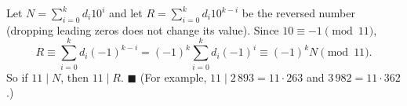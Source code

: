 Let $N=\sum_{i=0}^{k}d_i10^i$ and let $R=\sum_{i=0}^{k}d_i10^{k-i}$ be the reversed number (dropping leading zeros does not change its value). Since $10\equiv-1\pmod{11}$,
\[R\equiv\sum_{i=0}^{k}d_i(-1)^{k-i}=(-1)^k\sum_{i=0}^{k}d_i(-1)^{i}\equiv(-1)^kN\pmod{11}.\]
So if $11\mid N$, then $11\mid R$. $\blacksquare$ (For example, $11\mid 2\,893=11\cdot263$ and $3\,982=11\cdot362$.)

